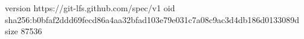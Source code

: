 version https://git-lfs.github.com/spec/v1
oid sha256:b0bfaf2ddd69fecd86a4aa32bfad103e79e031c7a08c9ac3d4db186d0133089d
size 87536
